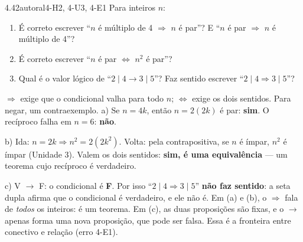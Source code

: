 \begin{exemplo}{4.4}{2}{autoral}{4-H2, 4-U3, 4-E1}\label{ex:4.4}
Para inteiros $n$:
\begin{enumerate}[label=\alph*)]
  \item É correto escrever \enquote{$n$ é múltiplo de 4 $\Rightarrow$ $n$ é par}? E \enquote{$n$ é par $\Rightarrow$ $n$ é múltiplo de 4}?
  \item É correto escrever \enquote{$n$ é par $\Leftrightarrow$ $n^2$ é par}?
  \item Qual é o valor lógico de \enquote{$2\mid4\rightarrow3\mid5$}? Faz sentido escrever \enquote{$2\mid4\Rightarrow3\mid5$}?
\end{enumerate}
\plano $\Rightarrow$ exige que o condicional valha para todo $n$; $\Leftrightarrow$ exige os dois sentidos. Para negar, um contraexemplo.
\resolucao
a) Se $n=4k$, então $n=2(2k)$ é par: \textbf{sim}. O recíproco falha em $n=6$: \textbf{não}.
\par b) Ida: $n=2k\Rightarrow n^2=2(2k^2)$. Volta: pela contrapositiva, se $n$ é ímpar, $n^2$ é ímpar (Unidade 3). Valem os dois sentidos: \textbf{sim, é uma equivalência} — um teorema cujo recíproco é verdadeiro.
\par c) V $\rightarrow$ F: o condicional é \textbf{F}. Por isso \enquote{$2\mid4\Rightarrow3\mid5$} \textbf{não faz sentido}: a seta dupla afirma que o condicional é verdadeiro, e ele não é.
\comentario Em (a) e (b), o $\Rightarrow$ fala de \emph{todos} os inteiros: é um teorema. Em (c), as duas proposições são fixas, e o $\rightarrow$ apenas forma uma nova proposição, que pode ser falsa. Essa é a fronteira entre conectivo e relação (erro 4-E1).
\end{exemplo}

